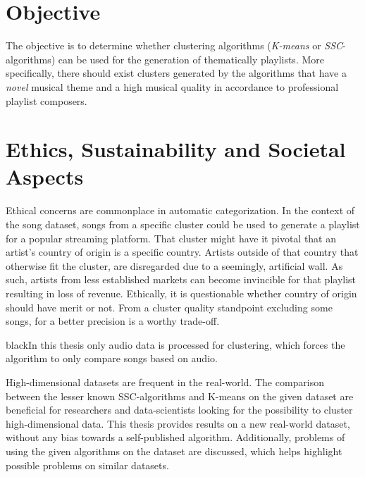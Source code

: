 \documentclass[../report.tex]{subfiles}
\begin{document}
\section{Objective}

The objective is to determine whether clustering algorithms (\textit{K-means} or \textit{SSC}-algorithms) can be used for the generation of thematically playlists. More specifically, there should exist clusters generated by the algorithms that have a \textit{novel} musical theme and a high musical quality in accordance to professional playlist composers.



\section{Ethics, Sustainability and \newline Societal Aspects}
Ethical concerns are commonplace in automatic categorization. In the context of the song dataset, songs from a specific cluster could be used to generate a playlist for a popular streaming platform. That cluster might have it pivotal that an artist's country of origin is a specific country. Artists outside of that country that otherwise fit the cluster, are disregarded due to a seemingly, artificial wall. As such, artists from less established markets can become invincible for that playlist resulting in loss of revenue. Ethically, it is questionable whether country of origin should have merit or not. From a cluster quality standpoint excluding some songs, for a better precision is a worthy trade-off. \begin{color}{black}In this thesis only audio data is processed for clustering, which forces the algorithm to only compare songs based on audio.

High-dimensional datasets are frequent in the real-world. The comparison between the lesser known SSC-algorithms and K-means on the given dataset are beneficial for researchers and data-scientists looking for the possibility to cluster high-dimensional data. This thesis provides results on a new real-world dataset, without any bias towards a self-published algorithm. Additionally, problems of using the given algorithms on the dataset are discussed, which helps highlight possible problems on similar datasets.
\end{color}
\end{document}
